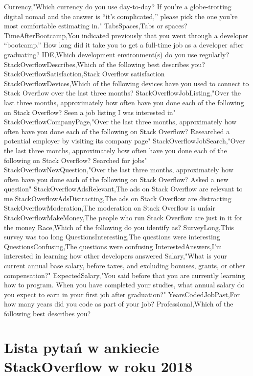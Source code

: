 \begin{appendices}
Currency,"Which currency do you use day-to-day? If you're a globe-trotting digital nomad and the answer is “it's complicated,” please pick the one you're most comfortable estimating in."
TabsSpaces,Tabs or spaces?
TimeAfterBootcamp,You indicated previously that you went through a developer “bootcamp.” How long did it take you to get a full-time job as a developer after graduating?
IDE,Which development environment(s) do you use regularly?
StackOverflowDescribes,Which of the following best describes you?
StackOverflowSatisfaction,Stack Overflow satisfaction
StackOverflowDevices,Which of the following devices have you used to connect to Stack Overflow over the last three months?
StackOverflowJobListing,"Over the last three months, approximately how often have you done each of the following on Stack Overflow? Seen a job listing I was interested in"
StackOverflowCompanyPage,"Over the last three months, approximately how often have you done each of the following on Stack Overflow? Researched a potential employer by visiting its company page"
StackOverflowJobSearch,"Over the last three months, approximately how often have you done each of the following on Stack Overflow? Searched for jobs"
StackOverflowNewQuestion,"Over the last three months, approximately how often have you done each of the following on Stack Overflow? Asked a new question"
StackOverflowAdsRelevant,The ads on Stack Overflow are relevant to me
StackOverflowAdsDistracting,The ads on Stack Overflow are distracting
StackOverflowModeration,The moderation on Stack Overflow is unfair
StackOverflowMakeMoney,The people who run Stack Overflow are just in it for the money
Race,Which of the following do you identify as?
SurveyLong,This survey was too long
QuestionsInteresting,The questions were interesting
QuestionsConfusing,The questions were confusing
InterestedAnswers,I'm interested in learning how other developers answered
Salary,"What is your current annual base salary, before taxes, and excluding bonuses, grants, or other compensation?"
ExpectedSalary,"You said before that you are currently learning how to program. When you have completed your studies, what annual salary do you expect to earn in your first job after graduation?"
YearsCodedJobPast,For how many years did you code as part of your job?
Professional,Which of the following best describes you?

\chapter{Lista pytań w ankiecie StackOverflow w roku 2018}\label{app:dod2}


\end{appendices}
